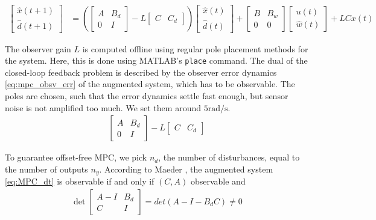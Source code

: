 \begin{align}
\begin{bmatrix}
\hat{x}(t+1) \\ \hat{d}(t+1)
\end{bmatrix}
&=\left(
\begin{bmatrix}
A & B_d \\
0 & I
\end{bmatrix}
- L
\begin{bmatrix}
C & C_d
\end{bmatrix}
\right) \begin{bmatrix}
\hat{x}(t) \\ \hat{d}(t)
\end{bmatrix}
+
\begin{bmatrix}
B & B_w \\
0 & 0
\end{bmatrix}
\begin{bmatrix}
u(t) \\ \hat{w}(t)
\end{bmatrix}
+
L C x(t) \label{eq:mpc_obsv_update}
\end{align}

The observer gain $L$ is computed offline using regular pole placement methods for the system. Here, this is done using MATLAB's \texttt{place} command. The dual of the closed-loop feedback problem is described by the observer error dynamics \ref{eq:mpc_obsv_err} of the augmented system, which has to be observable. The poles are chosen, such that the error dynamics settle fast enough, but sensor noise is not amplified too much. We set them around $5\si{\radian\per\second}$. 
\begin{align}
\begin{bmatrix}
A & B_d \\
0 & I
\end{bmatrix}
- L
\begin{bmatrix}
C & C_d
\end{bmatrix} \label{eq:mpc_obsv_err}
\end{align}

To guarantee offset-free MPC, we pick $n_d$, the number of disturbances, equal to the number of outputs $n_y$. According to Maeder \cite{Maeder2009}, the augmented system \ref{eq:MPC_dt} is observable if and only if $(C,A)$ observable and
\begin{align}
\det \begin{bmatrix}
A-I & B_d \\ C & I 
\end{bmatrix} = det(A-I-B_dC) \neq 0 \label{eq:mpc_obsv_cond}
\end{align}

